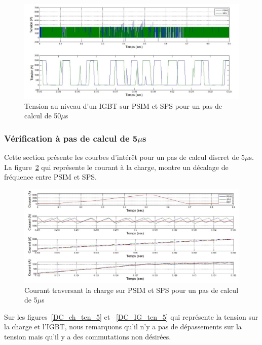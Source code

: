 \documentclass[11pt,letterpaper,final]{report}
\begin{document}
\begin{figure}[htb]
\centering
\includegraphics[scale=0.5]{Fig/DCPDCN/DCPTensionIGBT50u.jpg}
\caption{Tension au niveau d'un IGBT sur PSIM et SPS pour un pas de calcul de 50$\mu$s}
\label{DC_IG_ten_50}
\end{figure}


\clearpage

\subsubsection{Vérification à pas de calcul de 5$\mu$s}
Cette section présente les courbes d'intérêt pour un pas de calcul discret de 5$\mu$s. La figure~\ref{DC_ch_cou_5} qui représente le courant à la charge, montre un décalage de fréquence entre PSIM et SPS. 





\begin{figure}[htb]
\centering
\includegraphics[scale=0.5]{Fig/DCPDCN/DCPCourantCharge5u.jpg}
\caption{Courant traversant la charge sur PSIM et SPS pour un pas de calcul de 5$\mu$s}
\label{DC_ch_cou_5}
\end{figure}
Sur les figures~\ref{DC_ch_ten_5} et ~\ref{DC_IG_ten_5} qui représente la tension sur la charge et l'IGBT, nous remarquons qu'il n'y a pas de dépassements sur la tension  mais qu'il y a des commutations non désirées. 
\end{document}

